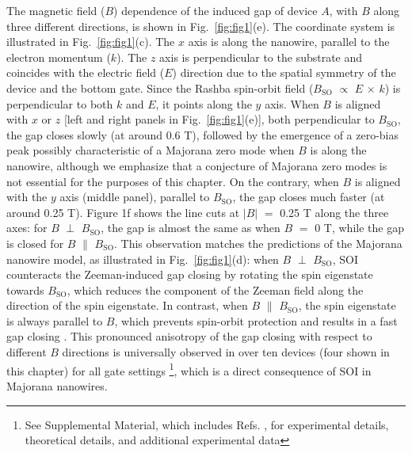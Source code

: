 The magnetic field ($B$) dependence of the induced gap of device $A$, with $B$ along three different directions, is shown in Fig.~\ref{fig:fig1}(e).
The coordinate system is illustrated in Fig.~\ref{fig:fig1}(c).
The $x$ axis is along the nanowire, parallel to the electron momentum ($k$).
The $z$ axis is perpendicular to the substrate and coincides with the electric field ($E$) direction due to the spatial symmetry of the device and the bottom gate.
Since the Rashba spin-orbit field ($B_{\mathrm{SO}}$ $\propto$ $E$ $\times$ $k$) is perpendicular to both $k$ and $E$, it points along the $y$ axis.
When $B$ is aligned with $x$ or $z$ [left and right panels in Fig.~\ref{fig:fig1}(e)], both perpendicular to $B_{\mathrm{SO}}$, the gap closes \mbox{slowly} (at around 0.6 T), followed by the emergence of a zero-bias peak possibly characteristic of a Majorana zero mode when $B$ is along the nanowire, although we emphasize that a conjecture of Majorana zero modes is not essential for the purposes of this chapter.
On the contrary, when $B$ is aligned with the $y$ axis (middle panel), parallel to $B_{\mathrm{SO}}$, the gap closes much faster (at around 0.25 T).
Figure 1f shows the line cuts at $|B|$ $=$ 0.25 T along the three axes: for $B$ $\perp$ $B_{\mathrm{SO}}$, the gap is almost the same as when $B$ $=$ 0 T, while the gap is closed for $B$ $\parallel$ $B_{\mathrm{SO}}$.
This observation matches the predictions of the Majorana nanowire model, as illustrated in Fig.~\ref{fig:fig1}(d): when $B$ $\perp$ $B_{\mathrm{SO}}$, SOI counteracts the Zeeman-induced gap closing by rotating the spin eigenstate towards $B_{\mathrm{SO}}$, which reduces the component of the Zeeman field along the direction of the spin eigenstate.
In contrast, when $B$ $\parallel$ $B_{\mathrm{SO}}$, the spin eigenstate is always parallel to $B$, which prevents spin-orbit protection and results in a fast gap closing \cite{Osca2014,Rex2014}.
This pronounced anisotropy of the gap closing with respect to different $B$ directions is universally observed in over ten devices (four shown in this chapter) for all gate settings
\footnote{See Supplemental Material, which includes Refs.
 \cite{Car2014,Floehr2011,Suyatin2007,Guel2017,Liu2017a,Danon2017,Hofstadter1976,Gropp1996,Du1999,Prada2012,Pientka2012,Stanescu2012}, for experimental details, theoretical details, and additional experimental data}, which is a direct consequence of SOI in Majorana nanowires.
\nocite{Car2014,Floehr2011,Suyatin2007,Guel2017,Liu2017a,Danon2017,Hofstadter1976,Gropp1996,Du1999,Prada2012,Pientka2012,Stanescu2012}

